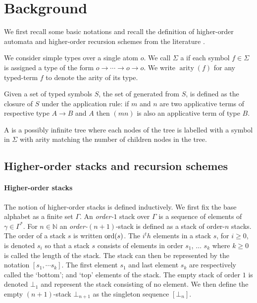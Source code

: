 \documentclass[a4paper]{article}[12pt]
\theoremstyle{remark}
\theoremstyle{definition}
\newcommand\arity{\mathop{\mathrm{arity}}}
\begin{document}
\section{Background}
We first recall some basic notations and recall the definition of higher-order automata and higher-order recursion schemes from the literature \cite{KNU02,hague-collaps-full}.

We consider simple types over a single atom $o$. We call $\Sigma$ a  if each symbol $f \in \Sigma$ is assigned a type of the form $o \longrightarrow  \cdots \longrightarrow o \longrightarrow  o$. We write $\arity(f)$ for any typed-term $f$ to denote the arity of its type.

Given a set of typed symbols $S$, the set of  generated from $S$, is defined as the closure of $S$ under the application rule: if $m$ and $n$ are two applicative terms of respective type $A\rightarrow B$ and $A$ then $(m n)$ is also an applicative term of type $B$.

A  is a possibly infinite tree where each nodes of the tree is labelled with a symbol in $\Sigma$ with arity matching the number of children nodes in the tree.


\subsection{Higher-order stacks and recursion schemes}

\paragraph{Higher-order stacks}
The notion of higher-order stacks is defined inductively. We first fix the base alphabet as a finite set $\Gamma$. An \emph{order-$1$} stack over $\Gamma$ is a sequence of elements of $\gamma \in \Gamma^*$. For $n \in \mathbb{N}$ an \emph{order-$(n+1)$}-stack is defined as a stack of order-$n$ stacks.
The order of a stack $s$ is written $\mathop{\mathrm{ord}}(s)$. The $i^th$ elements in a stack $s$, for $i\geq 0$, is denoted $s_i$ so that a stack $s$ consists of elements in order $s_1$, $\dots$ $s_k$ where $k\geq0$ is called the length of the stack. The stack can then be represented by the notation $[s_1, \cdots s_k]$. The first element $s_1$ and last element $s_k$ are respectively called the `bottom'; and `top' elements of the stack.
The empty stack of order $1$ is denoted $\bot_1$ and represent the stack consisting of no element. We then define the empty $(n+1)$-stack $\bot_{n+1}$ as the singleton sequence $[ \bot_n ]$.
\end{document}

